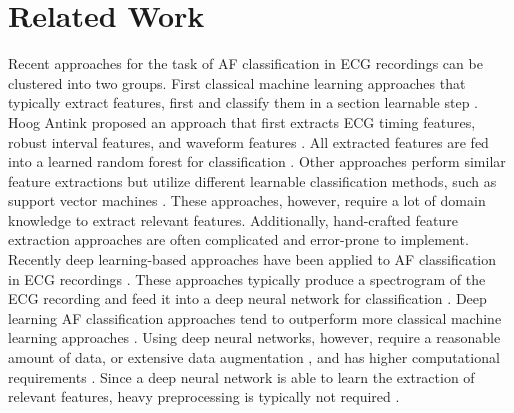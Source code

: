 \section{Related Work} \label{sec:rleated_work}
Recent approaches for the task of AF classification in ECG recordings can be clustered into two groups. First classical machine learning approaches that typically extract features, first and classify them in a section learnable step \cite{Antink2017, Smisek2017}. Hoog Antink \etal \cite{Antink2017} proposed an approach that first extracts ECG timing features, robust interval features, and waveform features \cite{Antink2017}. All extracted features are fed into a learned random forest for classification \cite{Antink2017}. Other approaches perform similar feature extractions but utilize different learnable classification methods, such as support vector machines \cite{Smisek2017}. These approaches, however, require a lot of domain knowledge to extract relevant features. Additionally, hand-crafted feature extraction approaches are often complicated and error-prone to implement.\\
\indent Recently deep learning-based approaches have been applied to AF classification in ECG recordings \cite{Zihlmann2017, Mousavi2019, Mashrur2019, Khriji2020, Nonaka2020}. These approaches typically produce a spectrogram of the ECG recording and feed it into a deep neural network for classification \cite{Zihlmann2017, Mashrur2019}. Deep learning AF classification approaches tend to outperform more classical machine learning approaches \cite{Mousavi2019, Khriji2020}. Using deep neural networks, however, require a reasonable amount of data, or extensive data augmentation \cite{Perez2017}, and has higher computational requirements \cite{Lecun2015, Goodfellow2016}. Since a deep neural network is able to learn the extraction of relevant features, heavy preprocessing is typically not required \cite{Zihlmann2017, Lecun2015, Goodfellow2016}.
